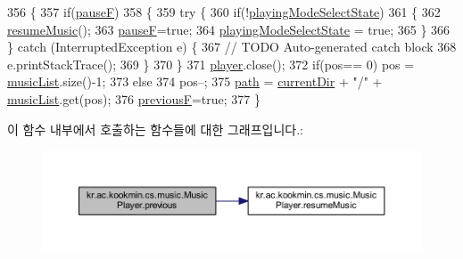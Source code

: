 \begin{DoxyCode}
356   \{
357     \textcolor{keywordflow}{if}(\hyperlink{classkr_1_1ac_1_1kookmin_1_1cs_1_1music_1_1_music_player_a9cbd432293e5e11088c6bfb4b31db11c}{pauseF})
358     \{
359       \textcolor{keywordflow}{try} \{
360         \textcolor{keywordflow}{if}(!\hyperlink{classkr_1_1ac_1_1kookmin_1_1cs_1_1music_1_1_music_player_ae2610567e63c44b6bba0eabdd1868e33}{playingModeSelectState})
361         \{
362           \hyperlink{classkr_1_1ac_1_1kookmin_1_1cs_1_1music_1_1_music_player_a889d56a689747ddb862ae3a76f682803}{resumeMusic}();
363           \hyperlink{classkr_1_1ac_1_1kookmin_1_1cs_1_1music_1_1_music_player_a9cbd432293e5e11088c6bfb4b31db11c}{pauseF}=\textcolor{keyword}{true};
364           \hyperlink{classkr_1_1ac_1_1kookmin_1_1cs_1_1music_1_1_music_player_ae2610567e63c44b6bba0eabdd1868e33}{playingModeSelectState} = \textcolor{keyword}{true};
365         \}
366       \} \textcolor{keywordflow}{catch} (InterruptedException e) \{
367         \textcolor{comment}{// TODO Auto-generated catch block}
368         e.printStackTrace();
369       \}
370     \}
371     \hyperlink{classkr_1_1ac_1_1kookmin_1_1cs_1_1music_1_1_music_player_ae3ec295f2404ad30d9ff20208cda065e}{player}.close();
372     \textcolor{keywordflow}{if}(pos== 0) pos = \hyperlink{classkr_1_1ac_1_1kookmin_1_1cs_1_1music_1_1_music_player_a43bc24d44f1079340c3c9983c7df88a2}{musicList}.size()-1;
373     \textcolor{keywordflow}{else} 
374       pos--;
375     \hyperlink{classkr_1_1ac_1_1kookmin_1_1cs_1_1music_1_1_music_player_ae9763f1d531b65e0be29470b24704f4f}{path} = \hyperlink{classkr_1_1ac_1_1kookmin_1_1cs_1_1music_1_1_music_player_a2614e5b1bf00c55b57e08354bcb6be19}{currentDir} + \textcolor{stringliteral}{"/"} + \hyperlink{classkr_1_1ac_1_1kookmin_1_1cs_1_1music_1_1_music_player_a43bc24d44f1079340c3c9983c7df88a2}{musicList}.get(pos);
376     \hyperlink{classkr_1_1ac_1_1kookmin_1_1cs_1_1music_1_1_music_player_a2cbe57c0e490a5d3e85adff6bc53e34e}{previousF}=\textcolor{keyword}{true};
377   \}
\end{DoxyCode}


이 함수 내부에서 호출하는 함수들에 대한 그래프입니다.\+:\nopagebreak
\begin{figure}[H]
\begin{center}
\leavevmode
\includegraphics[width=350pt]{classkr_1_1ac_1_1kookmin_1_1cs_1_1music_1_1_music_player_a2b1956b10fac3122dcfb3f0dfc8b0be2_cgraph}
\end{center}
\end{figure}




